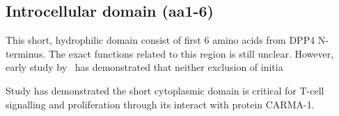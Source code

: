 \subsection{Introcellular domain (aa1-6)}

This short, hydrophilic domain consist of first 6 amino acids from DPP4 N-terminus. The exact functions related to this region is still unclear. However, early study by~\citet{Hong1990} has demonstrated that neither exclusion of initia

Study has demonstrated the short cytoplasmic domain is critical for T-cell signalling and proliferation through its interact with protein CARMA-1. \cite{Ohnuma_2007}